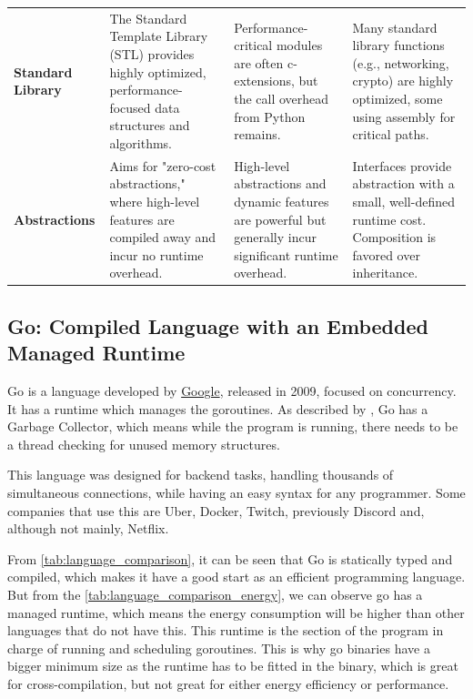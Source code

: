 \begin{table}
\begin{tabularx}{\textwidth}{
		>{\raggedright\arraybackslash}p{}
		>{\raggedright\arraybackslash}X
		>{\raggedright\arraybackslash}X
		>{\raggedright\arraybackslash}X
	}
		\textbf{Standard Library} &
		The Standard Template Library (STL) provides highly optimized, performance-focused data structures and algorithms. &
		Performance-critical modules are often \Glspl{c-extension}, but the call overhead from Python remains. &
		Many standard library functions (e.g., networking, crypto) are highly optimized, some using assembly for critical paths. \\
        \addlinespace

		\textbf{Abstractions} &
		Aims for "zero-cost abstractions," where high-level features are compiled away and incur no runtime overhead. &
		High-level abstractions and dynamic features are powerful but generally incur significant runtime overhead. &
		Interfaces provide abstraction with a small, well-defined runtime cost. Composition is favored over inheritance. \\
		\bottomrule
	\end{tabularx}
\end{table}



\subsection{Go: Compiled Language with an Embedded Managed Runtime}
Go is a language developed by \href{https://google.com}{Google}, released in 2009, focused on concurrency. It has a runtime which manages the \glspl{goroutine}. As described by \cite{rosecrance2019garbage}, Go has a Garbage Collector, which means while the program is running, there needs to be a thread checking for unused memory structures. 

This language was designed for backend tasks, handling thousands of simultaneous connections, while having an easy syntax for any programmer. Some companies that use this are Uber, Docker, Twitch, previously Discord \cite{discord-blog-go-rust} and, although not mainly, Netflix.  %

From \autoref{tab:language_comparison}, it can be seen that Go is statically typed and compiled, which makes it have a good start as an efficient programming language. But from the \autoref{tab:language_comparison_energy}, we can observe go has a managed runtime, which means the energy consumption will be higher than other languages that do not have this. This runtime is the section of the program in charge of running and scheduling \glspl{goroutine}. This is why go binaries have a bigger minimum size as the runtime has to be fitted in the binary, which is great for \gls{cross-compilation}, but not great for either energy efficiency or performance.

